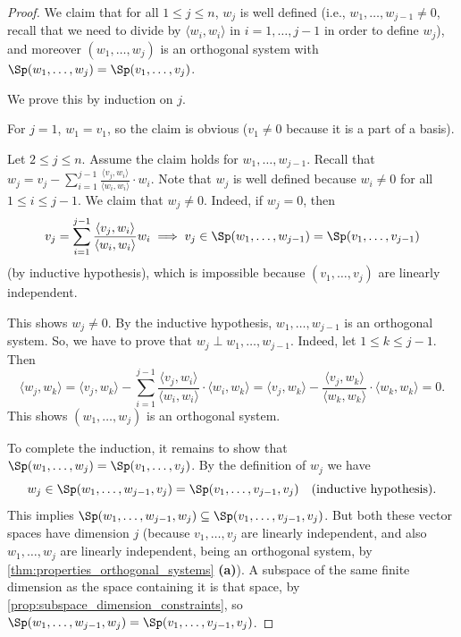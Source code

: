 \begin{proof}
    We claim that for all $1 \leq j \leq n$, $w_j$ is well defined (i.e., $w_1, \dots, w_{j-1} \neq 0$, recall that we need to divide by $\langle w_i, w_i \rangle$ in $i = 1, \dots, j-1$ in order to define $w_j$), and moreover $(w_1, \dots, w_j)$ is an orthogonal system with $\Sp(w_1, \dots, w_j) = \Sp(v_1, \dots, v_j)$.
    
    We prove this by induction on $j$.
    
    For $j = 1$, $w_1 = v_1$, so the claim is obvious ($v_1 \neq 0$ because it is a part of a basis).
    
    Let $2 \leq j \leq n$. Assume the claim holds for $w_1, \dots, w_{j-1}$.
    Recall that $w_j = v_j - \sum_{i=1}^{j-1} \frac{\langle v_j, w_i \rangle}{\langle w_i, w_i \rangle} \cdot w_i$. Note that $w_j$ is well defined because $w_i \neq 0$ for all $1 \leq i \leq j-1$. We claim that $w_j \neq 0$. Indeed, if $w_j = 0$, then 
    \[
        v_j = \sum_{i=1}^{j-1} \frac{\langle v_j, w_i \rangle}{\langle w_i, w_i \rangle} w_i \implies v_j \in \Sp(w_1, \dots, w_{j-1}) = \Sp(v_1, \dots, v_{j-1})
    \]
    (by inductive hypothesis), which is impossible because $(v_1, \dots, v_j)$ are linearly independent.
    
    This shows $w_j \neq 0$. By the inductive hypothesis, $w_1, \dots, w_{j-1}$ is an orthogonal system. So, we have to prove that $w_j \perp w_1, \dots, w_{j-1}$.
    Indeed, let $1 \leq k \leq j-1$. Then
    \[
        \langle w_j, w_k \rangle = \langle v_j, w_k \rangle - \sum_{i=1}^{j-1} \frac{\langle v_j, w_i \rangle}{\langle w_i, w_i \rangle} \cdot \langle w_i, w_k \rangle = \langle v_j, w_k \rangle - \frac{\langle v_j, w_k \rangle}{\langle w_k, w_k \rangle} \cdot \langle w_k, w_k \rangle = 0.
    \]
    This shows $(w_1, \dots, w_j)$ is an orthogonal system. 
    
    To complete the induction, it remains to show that $\Sp(w_1, \dots, w_j) = \Sp(v_1, \dots, v_j)$. By the definition of $w_j$ we have
    \[
        w_j \in \Sp(w_1, \dots, w_{j-1}, v_j) = \Sp(v_1, \dots, v_{j-1}, v_j) \quad \text{(inductive hypothesis)}.
    \]
    This implies $\Sp(w_1, \dots, w_{j-1}, w_j) \subseteq \Sp(v_1, \dots, v_{j-1}, v_j)$. But both these vector spaces have dimension $j$ (because $v_1, \dots, v_j$ are linearly independent, and also $w_1, \dots, w_j$ are linearly independent, being an orthogonal system, by \cref{thm:properties_orthogonal_systems} \textbf{(a)}). A subspace of the same finite dimension as the space containing it is that space, by \cref{prop:subspace_dimension_constraints}, so $\Sp(w_1, \dots, w_{j-1}, w_j) = \Sp(v_1, \dots, v_{j-1}, v_j)$.
\end{proof}

